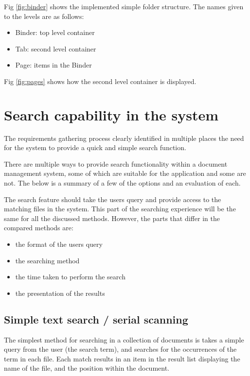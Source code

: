 Fig \ref{fig:binder} shows the implemented simple folder structure. The names
given to the levels are as follows: 
\begin{itemize}
  \item Binder: top level container
  \item Tab: second level container
  \item Page: items in the Binder
\end{itemize}
Fig \ref{fig:pages} shows how the second level container is
displayed.

\section{Search capability in the system}\label{search-capability-in-the-system}

The requirements gathering process clearly identified in multiple places the
need for the system to provide a quick and simple search function.

There are multiple ways to provide search functionality within a document
management system, some of which are suitable for the application and some are
not. The below is a summary of a few of the options and an evaluation of each.

The search feature should take the users query and provide access to the
matching files in the system. This part of the searching experience will be the
same for all the discussed methods. However, the parts that differ in the
compared methods are:
\begin{itemize}
  \item the format of the users query
  \item the searching method
  \item the time taken to perform the search
  \item the presentation of the results
\end{itemize}

\subsection{Simple text search / serial scanning}%
\label{simple-text-search-serial-scanning}

The simplest method for searching in a collection of documents is takes a
simple query from the user (the search term), and searches for the occurrences
of the term in each file. Each match results in an item in the result list
displaying the name of the file, and the position within the document.

